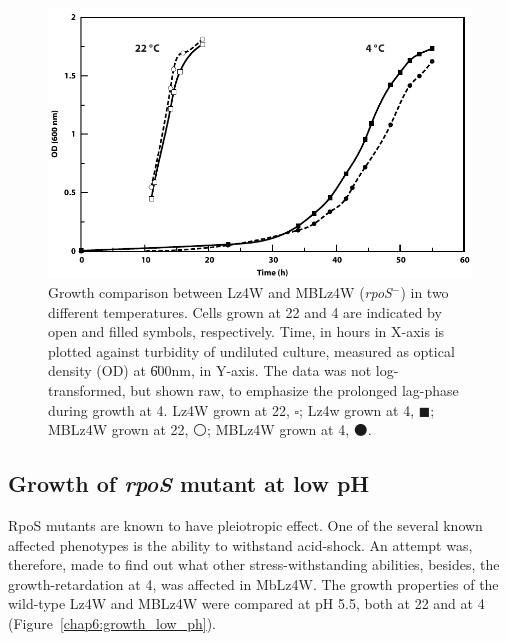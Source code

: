 \begin{figure}[tbp]
\begin{narrow}{-.5in}{-.5in}
\centering
\includegraphics{figures/chap6_mutant_wild_growth}
\end{narrow}
\caption[Growth comparison between Lz4W and MBLz4W]{Growth
comparison between Lz4W and MBLz4W (\emph{rpoS}$^{-}$) in two
different temperatures. Cells grown at 22\dg{} and 4\dg{} are
indicated by open and filled symbols, respectively. Time, in hours
in X-axis is plotted against turbidity of undiluted culture,
measured as optical density (OD) at \U{600}{nm}, in Y-axis. The
data was not log-transformed, but shown raw, to emphasize the
prolonged lag-phase during growth at 4\dg{}\@. Lz4W grown at
22\dg{}, $\square$; Lz4w grown at 4\dg{}, $\blacksquare$; MBLz4W
grown at 22\dg{}, $\medcirc$; MBLz4W grown at 4\dg{},
$\medbullet$.} \label{chap6:mutant_cold_growth}
\end{figure}



\subsection{Growth of \emph{rpoS} mutant at low pH}

RpoS mutants are known to have pleiotropic effect. One of the
several known affected phenotypes is the ability to withstand
acid-shock. An attempt was, therefore, made to find out what other
stress-withstanding abilities, besides, the growth-retardation at
4\dg{}, was affected in MbLz4W. The growth properties of the
wild-type Lz4W and MBLz4W were compared at pH 5.5, both at 22 and
at 4\dg{} (Figure~\ref{chap6:growth_low_ph}).

